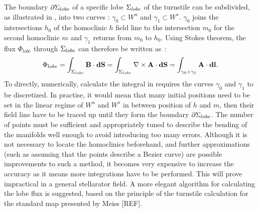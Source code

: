 The boundary $\partial\Sigma_{lobe}$ of a specific lobe $\Sigma_{lobe}$ of the turnstile can be subdivided, as illustrated in , into two curves : $\gamma_0\subset W^u$ and $\gamma_1\subset W^s$. $\gamma_0$ joins the intersections $h_0$ of the homoclinic $h$ field line to the intersection $m_0$ for the second homoclinic $m$ and $\gamma_1$ returns from $m_0$ to $h_0$. Using Stokes theorem, the flux  $\Phi_{lobe}$  through $\Sigma_{lobe}$ can therefore be written as~:
\begin{equation}\label{eq:contour-1}
    \Phi_{lobe} = \int_{\Sigma_{lobe}} \textbf{B}\cdot\textbf{dS} = \int_{\Sigma_{lobe}} \nabla\times\textbf{A}\cdot\textbf{dS} = \int_{\gamma_0+\gamma_1} \textbf{A}\cdot \textbf{dl}.
\end{equation}
To directly, numerically, calculate the integral in  requires the curves $\gamma_0$ and $\gamma_1$ to be discretized. In practise, it would mean that many initial positions need to be set in the linear regime of $W^u$ and $W^s$ in between position of $h$ and $m$, then their field line have to be traced up until they form the boundary $\partial\Sigma_{lobe}$. The number of points must be sufficient and appropriately tuned to describe the bending of the manifolds well enough to avoid introducing too many errors. Although it is not necessary to locate the homoclinics beforehand, and further approximations (such as assuming that the points describe a Bezier curve) are possible improvements to such a method, it becomes very expensive to increase the accuracy as it means more integrations have to be performed. This will prove impractical in a general stellarator field. A more elegant algorithm for calculating the lobe flux is suggested, based on the principle of the turnstile calculation for the standard map presented by Meiss [REF].

